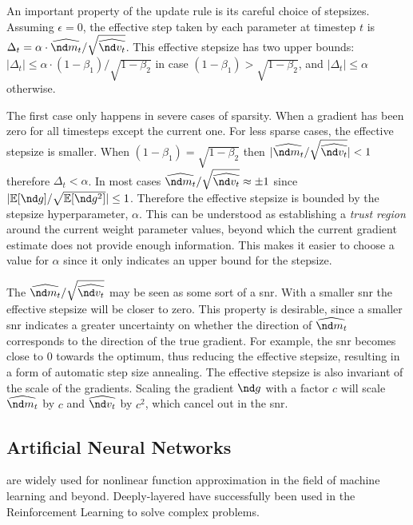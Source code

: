 An important property of the update rule is its careful choice of stepsizes. Assuming $\epsilon=0$, the effective step taken by each parameter at timestep $t$ is $\Delta_t=\alpha\cdot \widehat{\nd m_t}/\sqrt{\widehat{\nd v_t}}$. This effective stepsize has two upper bounds: $|\Delta_t| \leq \alpha\cdot (1-\beta_1)/\sqrt{1-\beta_2}$ in case $(1-\beta_1) > \sqrt{{1-\beta_2}}$, and  $|\Delta_t| \leq \alpha$ otherwise. 

The first case only happens in severe cases of sparsity. When a gradient has been zero for all timesteps except the current one. For less sparse cases, the effective stepsize is smaller. When $(1-\beta_1) = \sqrt{1-\beta_2}$ then $|\widehat{\nd m_t}/ \sqrt{\widehat{\nd v_t}}| < 1$ therefore $\Delta_t < \alpha$. In most cases $\widehat{\nd m_t}/ \sqrt{\widehat{\nd v_t}} \approx \pm 1$ since $|\mathbb{E}[\nd g]/\sqrt{\mathbb{E}[\nd g^2]}| \leq 1$. Therefore the effective stepsize is bounded by the stepsize hyperparameter, $\alpha$. This can be understood as establishing a \emph{trust region} around the current weight parameter values, beyond which the current gradient estimate does not provide enough information. This makes it easier to choose a value for $\alpha$ since it only indicates an upper bound for the stepsize.

The $\widehat{\nd m_t}/ \sqrt{\widehat{\nd v_t}}$ may be seen as some sort of a \acrfull{snr}. With a smaller \acrshort{snr} the effective stepsize will be closer to zero. This property is desirable, since a smaller \acrshort{snr} indicates a greater uncertainty on whether the direction of $\widehat{\nd m_t}$ corresponds to the direction of the true gradient. For example, the \acrshort{snr} becomes close to $0$ towards the optimum, thus reducing the effective stepsize, resulting in a form of automatic step size annealing. The effective stepsize is also invariant of the scale of the gradients. Scaling the gradient $\nd g$ with a factor $c$ will scale $\widehat{\nd m_t}$ by $c$ and $\widehat{\nd v_t}$ by $c^2$, which cancel out in the \acrshort{snr}.

\subsection{Artificial Neural Networks}
 are widely used for nonlinear function approximation in the field of machine learning and beyond. Deeply-layered  have successfully been used in the Reinforcement Learning to solve complex problems. 

